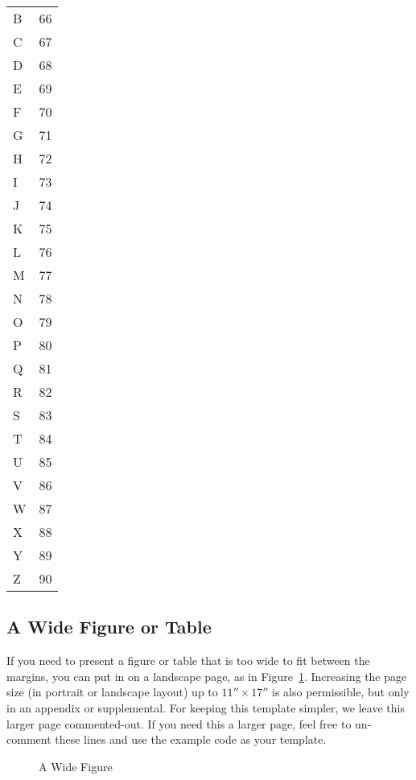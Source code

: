 \begin{center}
\begin{longtable}{lr}
    B & 66 \\
    C & 67 \\
    D & 68 \\
    E & 69 \\
    F & 70 \\
    G & 71 \\
    H & 72 \\
    I & 73 \\
    J & 74 \\
    K & 75 \\
    L & 76 \\
    M & 77 \\
    N & 78 \\
    O & 79 \\
    P & 80 \\
    Q & 81 \\
    R & 82 \\
    S & 83 \\
    T & 84 \\
    U & 85 \\
    V & 86 \\
    W & 87 \\
    X & 88 \\
    Y & 89 \\
    Z & 90 \\
\end{longtable}
\end{center}

\subsection{A Wide Figure or Table}
If you need to present a figure or table that is too wide to fit between the margins, you can put in on a landscape page, as in Figure~\ref{fig:wide}.
Increasing the page size (in portrait or landscape layout) up to $11''\times17''$ is also permissible, but only in an appendix or supplemental.
For keeping this template simpler, we leave this larger page commented-out.
If you need this a larger page, feel free to un-comment these lines and use the example code as your template.

\begin{landscape}
\vspace*{\fill} %
\begin{figure}[H]
\centering
\caption{A Wide Figure}
\label{fig:wide}
\end{figure}
\vspace*{\fill}
\end{landscape}


